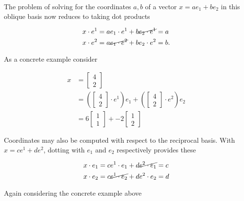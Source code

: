 The problem of solving for the coordinates $a,b$ of a vector $x = a e_1 + b e_2$ in this oblique basis now reduces to taking dot products

\begin{align}\label{eqn:grahamSchmidtLorentz:920}
x \cdot e^1 &= a e_1 \cdot e^1 + b \cancel{e_2 \cdot e^1} = a \\
x \cdot e^2 &= a \cancel{e_1 \cdot e^2} + b e_2 \cdot e^2 = b.
\end{align}

As a concrete example consider

\begin{equation}\label{eqn:grahamSchmidtLorentz:230}
\begin{aligned}
x &=
\begin{bmatrix}
4 \\
2
\end{bmatrix}  \\
&=
\left(
\begin{bmatrix}
4 \\
2
\end{bmatrix}
\cdot e^1
\right)
e_1
+
\left(
\begin{bmatrix}
4 \\
2
\end{bmatrix}
\cdot e^2
\right)
e_2 \\
&= 6
\begin{bmatrix}
1 \\
1
\end{bmatrix}
+
-2
\begin{bmatrix}
1 \\
2
\end{bmatrix}
\end{aligned}
\end{equation}

Coordinates may also be computed with respect to the reciprocal basis.  With $x = c e^1 + d e^2$, dotting with $e_1$ and $e_2$ respectively provides these

\begin{equation}\label{eqn:grahamSchmidtLorentz:360}
\begin{aligned}
x \cdot e_1 &= c e^1 \cdot e_1 + d \cancel{e^2 \cdot e_1} = c \\
x \cdot e_2 &= c \cancel{e^1 \cdot e_2} + d e^2 \cdot e_2 = d
\end{aligned}
\end{equation}

Again considering the concrete example above

